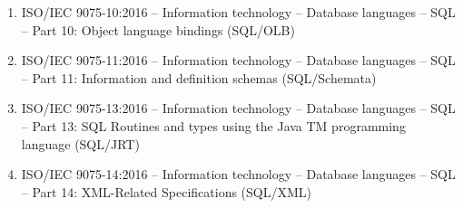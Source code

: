 \documentclass[preprint,12pt]{article}
\begin{document}
\begin{justify}
\begin {enumerate}
\item ISO/IEC 9075-10:2016 – Information technology – Database languages – SQL – Part 10: Object language bindings (SQL/OLB) 

\item ISO/IEC 9075-11:2016 – Information technology – Database languages – SQL – Part 11: Information and definition schemas (SQL/Schemata)

\item ISO/IEC 9075-13:2016 – Information technology – Database languages – SQL – Part 13: SQL Routines and types using the Java TM programming language (SQL/JRT) 

\item ISO/IEC 9075-14:2016 – Information technology – Database languages – SQL – Part 14: XML-Related Specifications (SQL/XML)\\\\


\end {enumerate}
	

\end{justify}
\end{document}
